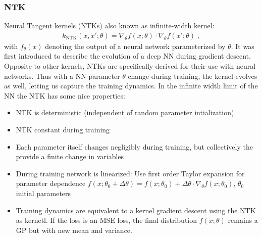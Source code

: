 \documentclass[11pt,a4paper]{article}
\begin{document}
\subsubsection*{NTK} %
Neural Tangent kernels (NTKs) also known as infinite-width kernel:
\begin{align}
    k_{\text{NTK}}(x, x'; \theta) = \nabla_{\theta} f(x; \theta) \cdot \nabla_{\theta} f(x' ; \theta) \; ,
\end{align}
with $f_{\theta}(x)$ denoting the output of a neural network parameterized by $\theta$.
It was first introduced to describe the evolution of a deep NN during gradient descent. Opposite to other kernels, NTKs are specifically derived for their use with neural networks.
Thus with a NN parameter $\theta$ change during training, the kernel evolves as well, letting us capture the training dynamics.
In the infinite width limit of the NN the NTK has some nice properties:
\begin{itemize}
    \item NTK is deterministic (independent of random parameter intialization)
    \item NTK constant during training
    \item Each parameter itself changes negligibly during training, but collectively the provide a finite change in variables
    \item During training network is linearized: Use first order Taylor expansion for parameter dependence 
          $f(x;\theta_0 + \Delta \theta) = f(x; \theta_0) + \Delta \theta \cdot \nabla_\theta f(x; \theta_0)$, $\theta_0$ initial parameters
    \item Training dynamics are equivalent to a kernel gradient descent using the NTK as kernetl. If the loss is an MSE loss, the final distribution $f(x; \theta)$ remains a GP but with new mean and variance.   
\end{itemize}
\end{document}
